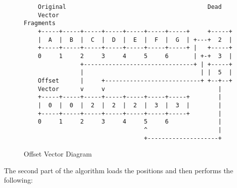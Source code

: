 \begin{figure}[H]
\begin{verbatim}
    Original                                        Dead                     
    Vector                                          Fragments                
    +-----+-----+-----+-----+-----+-----+-----+     +-----+                  
    |  A  |  B  |  C  |  D  |  E  |  F  |  G  | +---+  2  |                  
    +-----+-----+-----+-----+-----+-----+-----+ |   +-----+                  
    0     1     2     3     4     5     6       | +-+  3  |                  
                +-------------------------------+ | +-----+                  
                |                                 | |  5  |                  
    Offset      |     +---------------------------+ +--+--+                  
    Vector      v     v                                |                     
    +-----+-----+-----+-----+-----+-----+-----+        |                     
    |  0  |  0  |  2  |  2  |  2  |  3  |  3  |        |                     
    +-----+-----+-----+-----+-----+-----+-----+        |                     
    0     1     2     3     4     5     6              |                     
                                  ^                    |                     
                                  +--------------------+   
\end{verbatim}
\caption{Offset Vector Diagram}
\label{code:component_retrieval}
\end{figure}

The second part of the algorithm loads the positions and then performs the following: 

